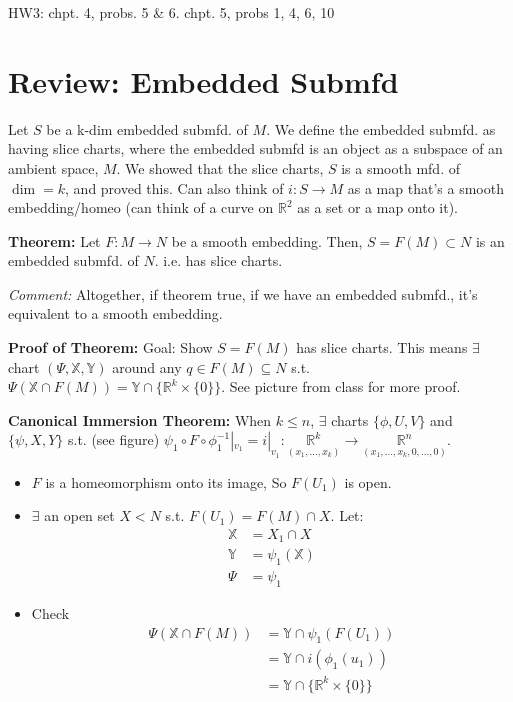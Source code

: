 \documentclass[12pt,letterpaper]{article}
\begin{document}
HW3: chpt. 4, probs. 5 & 6. chpt. 5, probs 1, 4, 6, 10

\section*{Review: Embedded Submfd}
Let $S$ be a k-dim embedded submfd. of $M$. We define the embedded submfd. as having slice charts, where the embedded submfd is an object as a subspace of an ambient space, $M$. We showed that the slice charts, $S$ is a smooth mfd. of$\dim=k$, and proved this. Can also think of $i: S \rightarrow M$ as a map that's a smooth embedding/homeo (can think of a curve on $\mathbb{R}^2$ as a set or a map onto it). 

\textbf{Theorem:} Let $F: M \rightarrow N$ be a smooth embedding. Then, $S = F(M) \subset N$ is an embedded submfd. of $N$. i.e. has slice charts.

\textit{Comment:} Altogether, if theorem true, if we have an embedded submfd., it's equivalent to a smooth embedding. 

\textbf{Proof of Theorem:} Goal: Show $S=F(M)$ has slice charts. This means $\exists$ chart $(\Psi, \mathbb{X}, \mathbb{Y})$ around any $q \in F(M) \subseteq N$ s.t. $\Psi(\mathbb{X} \cap F(M)) = \mathbb{Y} \cap \{ \mathbb{R}^k \times \{0\}\}$. See picture from class for more proof.

\textbf{Canonical Immersion Theorem:} When $k \leq n$, $\exists$ charts $\{ \phi, U, V\}$ and $\{ \psi, X, Y\}$ s.t. (see figure) $\psi_1 \circ F \circ \phi_1^{-1}|_{v_1} = i |_{v_1} : \underset{(x_1, \dots, x_k)}{\mathbb{R}^k} \rightarrow \underset{(x_1, \dots, x_k, 0, \dots, 0)}{\mathbb{R}^n}$.
\begin{itemize}
    \item $F$ is a homeomorphism onto its image, So $F(U_1)$ is open. 
    \item $\exists$ an open set $X < N$ s.t. $F(U_1) =  F(M) \cap X$. Let:
    \begin{align*}
        \mathbb{X} &= X_1 \cap X \\
        \mathbb{Y} &= \psi_1 (\mathbb{X}) \\
        \Psi &= \psi_1
    \end{align*}
    \item Check
    \begin{align*}
        \Psi ( \mathbb{X} \cap F(M) ) &= \mathbb{Y} \cap \psi_1 (F(U_1)) \\ 
        &= \mathbb{Y} \cap i(\phi_1(u_1)) \\
        &= \mathbb{Y} \cap \{ \mathbb{R}^k \times \{0\}\}
    \end{align*}
\end{itemize}
\end{document}
